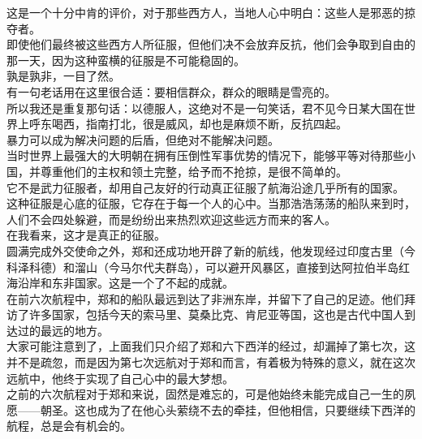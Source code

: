 \begin{multicols}{\theparacolNo}
这是一个十分中肯的评价，对于那些西方人，当地人心中明白：这些人是邪恶的掠夺者。\\

即使他们最终被这些西方人所征服，但他们决不会放弃反抗，他们会争取到自由的那一天，因为这种蛮横的征服是不可能稳固的。\\

孰是孰非，一目了然。\\

有一句老话用在这里很合适：要相信群众，群众的眼睛是雪亮的。\\

所以我还是重复那句话：以德服人，这绝对不是一句笑话，君不见今日某大国在世界上呼东喝西，指南打北，很是威风，却也是麻烦不断，反抗四起。\\

暴力可以成为解决问题的后盾，但绝对不能解决问题。\\

当时世界上最强大的大明朝在拥有压倒性军事优势的情况下，能够平等对待那些小国，并尊重他们的主权和领土完整，给予而不抢掠，是很不简单的。\\

它不是武力征服者，却用自己友好的行动真正征服了航海沿途几乎所有的国家。\\

这种征服是心底的征服，它存在于每一个人的心中。当那浩浩荡荡的船队来到时，人们不会四处躲避，而是纷纷出来热烈欢迎这些远方而来的客人。\\

在我看来，这才是真正的征服。\\

圆满完成外交使命之外，郑和还成功地开辟了新的航线，他发现经过印度古里（今科泽科德）和溜山（今马尔代夫群岛），可以避开风暴区，直接到达阿拉伯半岛红海沿岸和东非国家。这是一个了不起的成就。\\

在前六次航程中，郑和的船队最远到达了非洲东岸，并留下了自己的足迹。他们拜访了许多国家，包括今天的索马里、莫桑比克、肯尼亚等国，这也是古代中国人到达过的最远的地方。\\

大家可能注意到了，上面我们只介绍了郑和六下西洋的经过，却漏掉了第七次，这并不是疏忽，而是因为第七次远航对于郑和而言，有着极为特殊的意义，就在这次远航中，他终于实现了自己心中的最大梦想。\\

之前的六次航程对于郑和来说，固然是难忘的，可是他始终未能完成自己一生的夙愿——朝圣。这也成为了在他心头萦绕不去的牵挂，但他相信，只要继续下西洋的航程，总是会有机会的。\\


\end{multicols}
